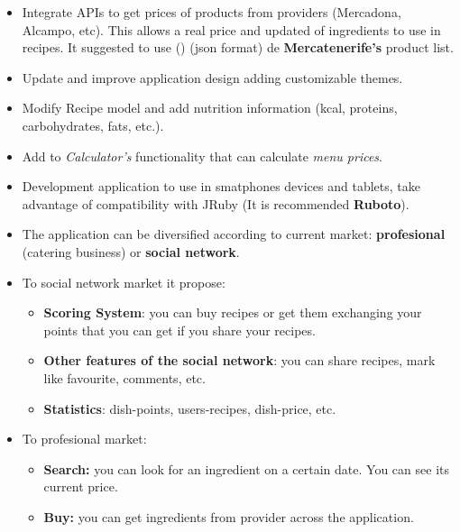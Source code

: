 \begin{itemize}
\item Integrate APIs to get prices of products from providers (Mercadona, Alcampo, etc). This allows a real price and updated of ingredients to use in recipes. It suggested to use (\cite{URL:Mercatenerife_Precio_Productos}) (json format) de \textbf{Mercatenerife's} product list.

\item Update and improve application design adding customizable themes.
\item Modify Recipe model and add nutrition information (kcal, proteins, carbohydrates, fats, etc.).
\item Add to \emph{Calculator's} functionality that can calculate \emph{menu prices}.
\item Development application to use in smatphones devices and tablets, take advantage of compatibility with JRuby (It is recommended \textbf{Ruboto}).
\item The application can be diversified according to current market: \textbf{profesional} (catering business) or \textbf{social network}.
	\item To social network market it propose:
		\begin{itemize}
			\item \textbf{Scoring System}: you can buy recipes or get them exchanging your points that you can get if you share your recipes.
			\item \textbf{Other features of the social network}: you can share recipes, mark like favourite, comments, etc.
			\item \textbf{Statistics}: dish-points, users-recipes, dish-price, etc.
		\end{itemize}
	\item To profesional market:
		\begin{itemize}
			\item \textbf{Search:} you can look for an ingredient on a certain date. You can see its current price.
			\item \textbf{Buy:} you can get ingredients from provider across the application.
		\end{itemize}

\end{itemize}
